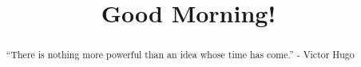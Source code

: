\documentclass{ximera}
\title{Good Morning!}
\begin{document}
\begin{abstract}
“There is nothing more powerful than an idea whose time has come.” - Victor Hugo
\end{abstract}
\maketitle
\end{document}
